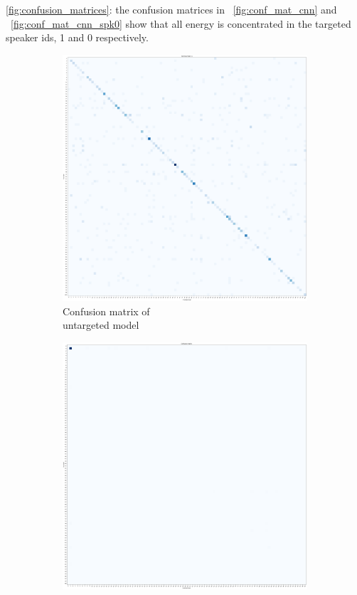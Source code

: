 \ref{fig:confusion_matrices}: the confusion matrices in ~\ref{fig:conf_mat_cnn} 
and ~\ref{fig:conf_mat_cnn_spk0} show that all energy is concentrated in the
targeted speaker ids, 1 and 0 respectively.
\begin{figure}[t]
    \centering
    \begin{subfigure}[b]{0.3\textwidth}
        \includegraphics[width=\textwidth]{./fig/conf_mat_cnn_knn.png}
        \caption{Confusion matrix of \\untargeted model}
        \label{fig:conf_mat_cnn_knn}
    \end{subfigure}
    \quad
    \begin{subfigure}[b]{0.3\textwidth}
        \includegraphics[width=\textwidth]{./fig/conf_mat_cnn_knn_targeted.png}

\end{subfigure}
\end{figure}
